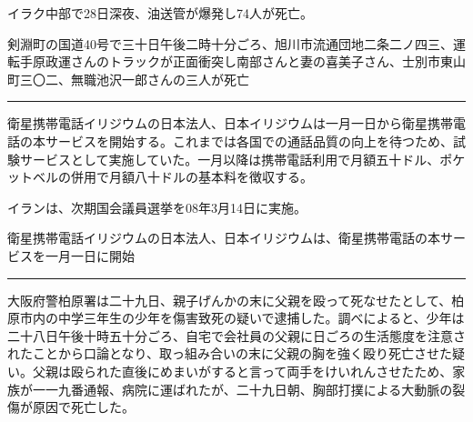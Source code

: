 \documentclass[japanese]{jnlp_1.4}
\begin{document}

\begin{InL}
イラク中部で28日深夜、油送管が爆発し74人が死亡。
\end{InL}


\begin{InL}
剣淵町の国道40号で三十日午後二時十分ごろ、旭川市流通団地二条二ノ四三、運転手原政運さんのトラックが正面衝突し南部さんと妻の喜美子さん、士別市東山町三〇二、無職池沢一郎さんの三人が死亡
\end{InL}

\vspace{0.5\baselineskip}
\hrule
\vspace{0.5\baselineskip}


\begin{InL}
衛星携帯電話イリジウムの日本法人、日本イリジウムは一月一日から衛星携帯電話の本サービスを開始する。これまでは各国での通話品質の向上を待つため、試験サービスとして実施していた。一月以降は携帯電話利用で月額五十ドル、ポケットベルの併用で月額八十ドルの基本料を徴収する。
\end{InL}


\begin{InL}
イランは、次期国会議員選挙を08年3月14日に実施。
\end{InL}


\begin{InL}
衛星携帯電話イリジウムの日本法人、日本イリジウムは、衛星携帯電話の本サービスを一月一日に開始
\end{InL}

\vspace{0.5\baselineskip}
\hrule
\vspace{0.5\baselineskip}


\begin{InL}
大阪府警柏原署は二十九日、親子げんかの末に父親を殴って死なせたとして、柏原市内の中学三年生の少年を傷害致死の疑いで逮捕した。調べによると、少年は二十八日午後十時五十分ごろ、自宅で会社員の父親に日ごろの生活態度を注意されたことから口論となり、取っ組み合いの末に父親の胸を強く殴り死亡させた疑い。父親は殴られた直後にめまいがすると言って両手をけいれんさせたため、家族が一一九番通報、病院に運ばれたが、二十九日朝、胸部打撲による大動脈の裂傷が原因で死亡した。
\end{InL}
\end{document}
